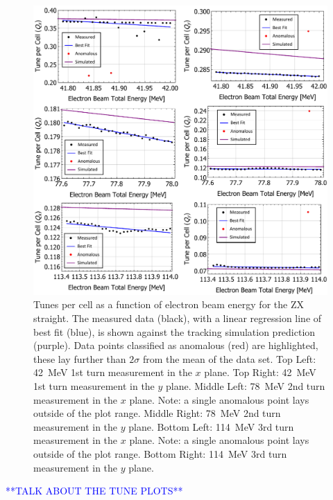 \documentclass[../main.tex]{subfiles}
\begin{document}
\begin{figure}[!h]
\centering
\includegraphics[width=\textwidth]{Figures/CBETA_Multi-Pass_Commissioning/chromaticity/ZX_analysed_3turn_tunes.pdf}
\caption{Tunes per cell as a function of electron beam energy for the ZX straight. The measured data (black), with a linear regression line of best fit (blue), is shown against the tracking simulation prediction (purple). Data points classified as anomalous (red) are highlighted, these lay further than $2\sigma$ from the mean of the data set. Top Left: 42~\si{\mega\electronvolt} 1st turn measurement in the $x$ plane. Top Right: 42~\si{\mega\electronvolt} 1st turn measurement in the $y$ plane. Middle Left: 78~\si{\mega\electronvolt} 2nd turn measurement in the $x$ plane. Note: a single anomalous point lays outside of the plot range. Middle Right: 78~\si{\mega\electronvolt} 2nd turn measurement in the $y$ plane. Bottom Left: 114~\si{\mega\electronvolt} 3rd turn measurement in the $x$ plane. Note: a single anomalous point lays outside of the plot range. Bottom Right: 114~\si{\mega\electronvolt} 3rd turn measurement in the $y$ plane.}
\label{fig:ZX_analysed_tunes}
\end{figure}

\textcolor{blue}{**TALK ABOUT THE TUNE PLOTS**}
\end{document}
